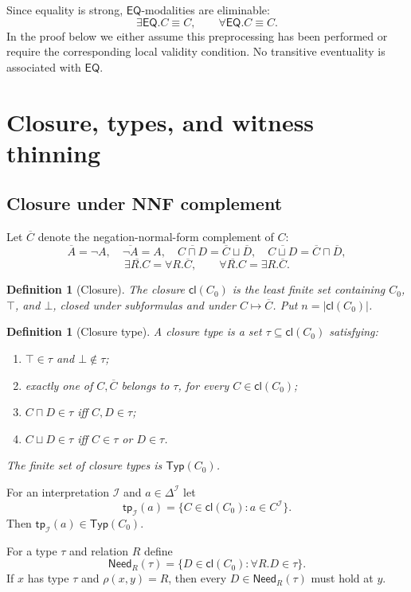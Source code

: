 \documentclass[11pt]{article}
\newtheorem{definition}[theorem]{Definition}
\newcommand{\EQ}{\mathsf{EQ}}
\newcommand{\Cl}{\mathsf{cl}}
\newcommand{\Typ}{\mathsf{Typ}}
\newcommand{\Need}{\mathsf{Need}}
\newcommand{\I}{\mathcal I}
\newcommand{\tp}{\mathsf{tp}}
\begin{document}
Since equality is strong, $\EQ$-modalities are eliminable:
\[
   \exists\EQ.C \equiv C,\qquad \forall\EQ.C \equiv C.
\]
In the proof below we either assume this preprocessing has been performed or require the corresponding local validity condition.  No transitive eventuality is associated with $\EQ$.

\section{Closure, types, and witness thinning}

\subsection{Closure under NNF complement}

Let $\overline C$ denote the negation-normal-form complement of $C$:
\[
\overline A=\neg A,
\quad \overline{\neg A}=A,
\quad
\overline{C\sqcap D}=\overline C\sqcup\overline D,
\quad
\overline{C\sqcup D}=\overline C\sqcap\overline D,
\]
\[
\overline{\exists R.C}=\forall R.\overline C,
\qquad
\overline{\forall R.C}=\exists R.\overline C.
\]

\begin{definition}[Closure]
The closure $\Cl(C_0)$ is the least finite set containing $C_0$, $\top$, and $\bot$, closed under subformulas and under $C\mapsto\overline C$.  Put $n=|\Cl(C_0)|$.
\end{definition}

\begin{definition}[Closure type]
A closure type is a set $\tau\subseteq\Cl(C_0)$ satisfying:
\begin{enumerate}[label=(T\arabic*)]
\item $\top\in\tau$ and $\bot\notin\tau$;
\item exactly one of $C,\overline C$ belongs to $\tau$, for every $C\in\Cl(C_0)$;
\item $C\sqcap D\in\tau$ iff $C,D\in\tau$;
\item $C\sqcup D\in\tau$ iff $C\in\tau$ or $D\in\tau$.
\end{enumerate}
The finite set of closure types is $\Typ(C_0)$.
\end{definition}

For an interpretation $\I$ and $a\in\Delta^\I$ let
\[
  \tp_\I(a)=\{C\in\Cl(C_0): a\in C^\I\}.
\]
Then $\tp_\I(a)\in\Typ(C_0)$.

For a type $\tau$ and relation $R$ define
\[
  \Need_R(\tau)=\{D\in\Cl(C_0): \forall R.D\in\tau\}.
\]
If $x$ has type $\tau$ and $\rho(x,y)=R$, then every $D\in\Need_R(\tau)$ must hold at $y$.
\end{document}
